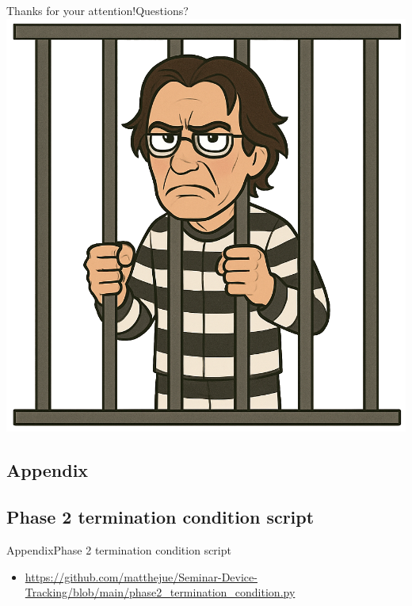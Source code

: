 \documentclass[aspectratio=169, hyperref={colorlinks=true, allcolors=SecondaryColor}, c]{beamer}
\begin{document}
	\begin{frame}{Thanks for your attention!}{Questions?}
    \includegraphics[height=0.7\paperheight, center]{./figures/computer_scientist_in_jail.png}
	\end{frame}
\else
\fi

\ifappendix
	\begin{withoutheadline}
	\section{Appendix}
	\end{withoutheadline}

  \subsection{Phase 2 termination condition script}

	\begin{frame}[fragile]{Appendix}{Phase 2 termination condition script}
    \begin{itemize}
      \item \url{https://github.com/matthejue/Seminar-Device-Tracking/blob/main/phase2_termination_condition.py}
    \end{itemize}
	\end{frame}
\end{document}
